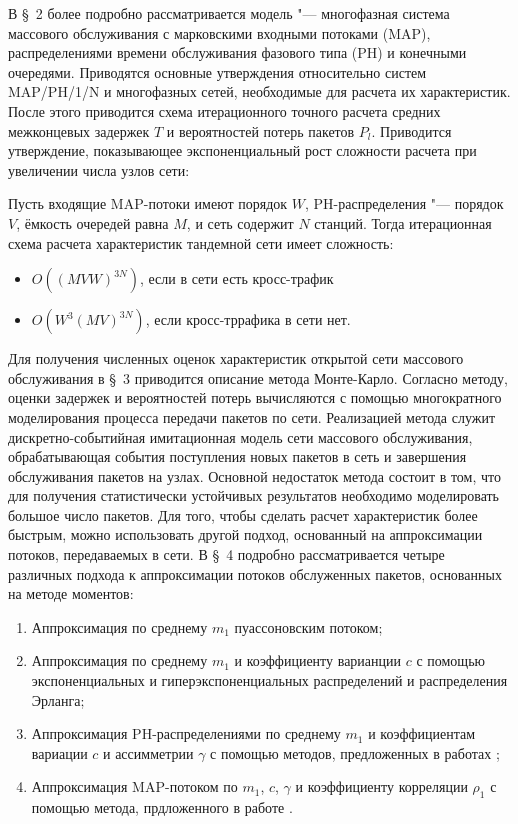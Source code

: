 В \S~2 более подробно рассматривается модель "--- многофазная система массового обслуживания с марковскими входными потоками (MAP), распределениями времени обслуживания фазового типа (PH) и конечными очередями. Приводятся основные утверждения относительно систем MAP/PH/1/N и многофазных сетей, необходимые для расчета их характеристик. После этого приводится схема итерационного точного расчета средних межконцевых задержек $T$ и вероятностей потерь пакетов $P_l$. Приводится утверждение, показывающее экспоненциальный рост сложности расчета при увеличении числа узлов сети:

\begin{prop}
  Пусть входящие MAP-потоки имеют порядок $W$, PH-распределения "--- порядок $V$, ёмкость очередей равна $M$, и сеть содержит $N$ станций. Тогда итерационная схема расчета характеристик тандемной сети имеет сложность:
  \begin{itemize}
    \item $O((M V W)^{3N})$, если в сети есть кросс-трафик
    \item $O(W^3 (M V)^{3N})$, если кросс-тррафика в сети нет.
  \end{itemize}
\end{prop}

Для получения численных оценок характеристик открытой сети массового обслуживания в \S~3 приводится описание метода Монте-Карло. Согласно методу, оценки задержек и вероятностей потерь вычисляются с помощью многократного моделирования процесса передачи пакетов по сети. Реализацией метода служит дискретно-событийная имитационная модель сети массового обслуживания, обрабатывающая события поступления новых пакетов в сеть и завершения обслуживания пакетов на узлах. Основной недостаток метода состоит в том, что для получения статистически устойчивых результатов необходимо моделировать большое число пакетов. Для того, чтобы сделать расчет характеристик более быстрым, можно использовать другой подход, основанный на аппроксимации потоков, передаваемых в сети. В \S~4 подробно рассматривается четыре различных подхода к аппроксимации потоков обслуженных пакетов, основанных на методе моментов:
\begin{enumerate}
  \item Аппроксимация по среднему $m_1$ пуассоновским потоком;
  \item Аппроксимация по среднему $m_1$ и коэффициенту варианции $c$ с помощью экспоненциальных и гиперэкспоненциальных распределений и распределения Эрланга;
  \item Аппроксимация PH-распределениями по среднему $m_1$ и коэффициентам вариации $c$ и ассимметрии $\gamma$ с помощью методов, предложенных в работах \cite{Johnson1989, Telek2003};
  \item Аппроксимация MAP-потоком по $m_1$, $c$, $\gamma$ и коэффициенту корреляции $\rho_1$ с помощью метода, прдложенного в работе \cite{Horvath2005}.
\end{enumerate}

